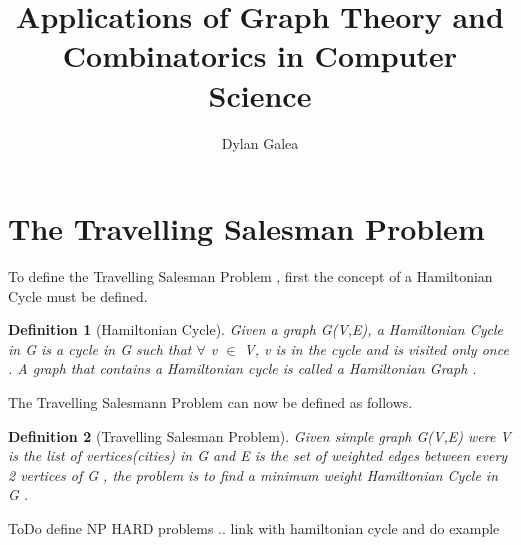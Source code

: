 \documentclass{article}
\title{Applications of Graph Theory and Combinatorics in Computer Science}
\author{Dylan Galea}
\newtheorem{definition}{Definition}[section]
\begin{document}
\maketitle
\section{The Travelling Salesman Problem}
To define the Travelling Salesman Problem , first the concept of a Hamiltonian Cycle must be defined.
\begin{definition}[Hamiltonian Cycle]
Given a graph G(V,E), a Hamiltonian Cycle in G is a cycle in G such that $\forall$ v $\in$ V, v is in the cycle and is visited only once . A graph that contains a Hamiltonian cycle is called a Hamiltonian Graph \cite{weisstein_2018}.
\end{definition}
The Travelling Salesmann Problem can now be defined as follows.
\begin{definition}[Travelling Salesman Problem]
Given simple graph G(V,E) were V is the list of vertices(cities) in G and E is the set of weighted edges between every 2 vertices of G , the problem is to find a minimum weight Hamiltonian Cycle in G \cite{geeksforgeeks_2018}.
\end{definition}
ToDo define NP HARD problems .. link with hamiltonian cycle and do example
\newpage{}


\end{document}
